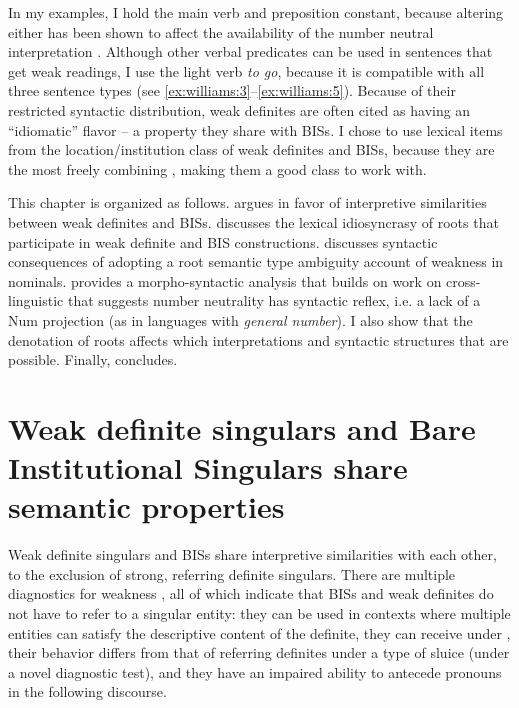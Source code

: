 \documentclass[output=paper,
modfonts
]{langscibook}
\begin{document}
In my examples, I hold the main verb and preposition constant, because altering either has been shown to affect the availability of the number neutral interpretation \citep[18--19]{Aguilar-Guevara2014}. Although other verbal predicates can be used in sentences that get weak readings, I use the light verb \textit{to go}, because it is compatible with all three sentence types (see \ref{ex:williams:3}--\ref{ex:williams:5}). Because of their restricted syntactic distribution, weak definites are often cited as having an ``idiomatic'' flavor \citep{NunbergEtAlii1994} -- a property they share with BISs. I chose to use lexical items from the location/institution class of weak definites \citep{stvan1998} and BISs, because they are the most freely combining \citep{BaldwinEtAlii2006}, making them a good class to work with.  

This chapter is organized as follows.  argues in favor of interpretive similarities between weak definites and BISs.  discusses the lexical idiosyncrasy of roots that participate in weak definite and BIS constructions.  discusses syntactic consequences of adopting a root semantic type ambiguity account of weakness in  nominals.  provides a morpho-syntactic analysis that builds on work on cross-linguistic  that suggests number neutrality has syntactic reflex, i.e. a lack of a Num projection (as in languages with \textit{general number}). I also show that the denotation of roots affects which interpretations and syntactic structures that are possible. Finally,  concludes.

\section{Weak definite singulars and Bare Institutional Singulars share semantic properties}\label{sec:williams:2}

Weak definite singulars and BISs share interpretive similarities with each other, to the exclusion of strong, referring definite singulars. There are multiple diagnostics for weakness \citep[see][]{CarlsonSussman2005}, all of which indicate that BISs and weak definites do not have to refer to a singular entity: they can be used in contexts where multiple entities can satisfy the descriptive content of the definite, they can receive  under , their behavior differs from that of referring definites under a type of sluice (under a novel diagnostic test), and they have an impaired ability to antecede pronouns in the following discourse. 
\end{document}
